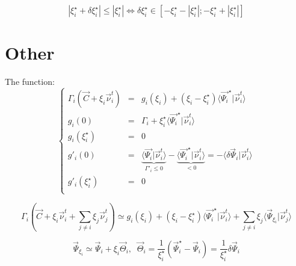 \documentclass[aps,12pt]{revtex4}
\begin{document}
\begin{equation}
|\xi_i^\star+\delta \xi_i^\star| \leq |\xi_i^\star| 
\Leftrightarrow 
\delta \xi_i^\star \in [ -\xi_i^\star - |\xi_i^\star| ; -\xi_i^\star + |\xi_i^\star|  ]
\end{equation}

\section{Other} 
  The function:
\begin{equation}
\left\lbrace
\begin{array}{rcl}
	\Gamma_i \left(\vec{C} +  \xi_i \vec{\nu}^t_i\right) & = &
	 g_i(\xi_i) + 
	 \left(\xi_i - \xi_i^\star\right) 	\langle \vec{\Psi_i}^\star \vert \vec{\nu}^t_i \rangle\\
	 g_i(0)            & = & \Gamma_i + \xi_i^\star \langle \vec{\Psi_i}^\star \vert \vec{\nu}^t_i \rangle \\
	 g_i(\xi_i^\star)  & = & 0\\
	 g'_i(0)           & = & \underbrace{\langle \vec{\Psi_i} \vert \vec{\nu}^t_i \rangle}_{\Gamma'_i\leq0} - \underbrace{\langle \vec{\Psi_i}^\star \vert \vec{\nu}^t_i \rangle}_{<0} 
	 = - \langle \delta\vec{\Psi}_i \vert \vec{\nu}^t_i \rangle\\
	 g'_i(\xi_i^\star) & = & 0\\
	 \end{array}
\right.
\end{equation}

\begin{equation}
	\Gamma_i \left(\vec{C} +  \xi_i \vec{\nu}^t_i  + \sum_{j\not=i} \xi_j \vec{\nu}^t_j \right) 
	\simeq g_i(\xi_i) + \left(\xi_i - \xi_i^\star\right)
	\langle \vec{\Psi_i}^\star \vert \vec{\nu}^t_i \rangle + \sum_{j\not=i} \xi_j \langle \vec{\Psi}_{\xi_i}  \vert \vec{\nu}^t_j \rangle
\end{equation} 	

\begin{equation}
	\vec{\Psi}_{\xi_i} \simeq \vec{\Psi}_i + \xi_i \vec{\Theta}_i,\;\;
	\vec{\Theta}_i = \dfrac{1}{\xi_i^\star}\left(\vec{\Psi}_i^\star-\vec{\Psi}_i\right)
	= \dfrac{1}{\xi_i^\star} \delta\vec{\Psi}_i
\end{equation}
\end{document}
